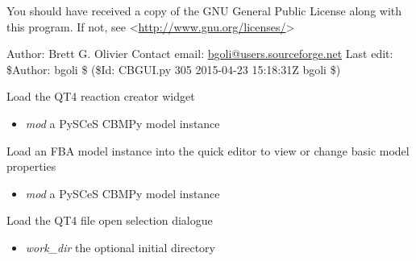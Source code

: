 \documentclass[a4paper,11pt,english]{sphinxmanual}
\begin{document}
You should have received a copy of the GNU General Public License
along with this program.  If not, see \textless{}\href{http://www.gnu.org/licenses/}{http://www.gnu.org/licenses/}\textgreater{}

Author: Brett G. Olivier
Contact email: \href{mailto:bgoli@users.sourceforge.net}{bgoli@users.sourceforge.net}
Last edit: \$Author: bgoli \$ (\$Id: CBGUI.py 305 2015-04-23 15:18:31Z bgoli \$)

\begin{fulllineitems}
\label{modules_doc:cbmpy.CBGUI.createReaction}
Load the QT4 reaction creator widget
\begin{itemize}
\item {} 
\emph{mod} a PySCeS CBMPy model instance

\end{itemize}

\end{fulllineitems}


\begin{fulllineitems}
\label{modules_doc:cbmpy.CBGUI.loadCBGUI}
Load an FBA model instance into the quick editor to view or change basic model properties
\begin{itemize}
\item {} 
\emph{mod} a PySCeS CBMPy model instance

\end{itemize}

\end{fulllineitems}


\begin{fulllineitems}
\label{modules_doc:cbmpy.CBGUI.openFileName}
Load the QT4 file open selection dialogue
\begin{itemize}
\item {} 
\emph{work\_dir} the optional initial directory

\end{itemize}

\end{fulllineitems}
\end{document}
